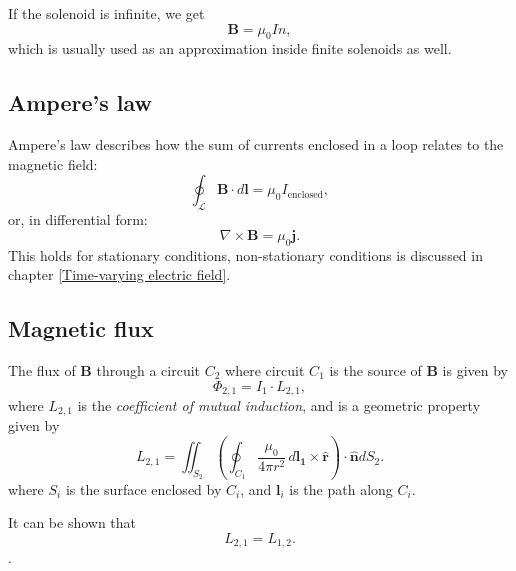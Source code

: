 \documentclass[a4paper, 12pt]{article}
\renewcommand{\vec}[1]{\bm{#1}}
\renewcommand{\j}{\ensuremath{\vec{j}}}
\newcommand{\B}{\ensuremath{\vec{B}}}
\let\tmp\hat
\renewcommand{\hat}[1]{\vec{\tmp{#1}}}
\begin{document}
            If the solenoid is infinite, we get
            \begin{equation}
                \B = \mu_0 In,
            \end{equation}
            which is usually used as an approximation inside finite solenoids as well.
    
    \subsection{Ampere's law}
        Ampere's law describes how the sum of currents enclosed in a loop relates to the magnetic field: 
        \begin{equation}
            \oint_\mathcal{L}\B\cdot d\vec{l} = \mu_0 I_{\text{enclosed}},
        \end{equation}
        or, in differential form: 
        \begin{equation}
            \nabla\times\B = \mu_0\j.
        \end{equation}
        This holds for stationary conditions, non-stationary conditions is discussed in chapter \ref{Time-varying electric field}. 

    \subsection{Magnetic flux} \label{Magnetic flux}
        The flux of \B{} through a circuit $C_2$ where circuit $C_1$ is the source of \B{} is given by
        \begin{equation}
            \Phi_{2,1} = I_1 \cdot L_{2,1},
        \end{equation}
        where $L_{2,1}$ is the \textit{coefficient of mutual induction}, and is a geometric property given by
        \begin{equation}
            L_{2,1} = \iint_{S_2} \left(\oint_{C_1}\frac{\mu_0}{4\pi r^2}\,d\vec{l_1}\times \hat{r} \right)\cdot \hat{n} dS_2.
        \end{equation}
        where $S_i$ is the surface enclosed by $C_i$, and $\vec{l}_i$ is the path along $C_i$.

        It can be shown that 
        \begin{equation}
            L_{2,1} = L_{1,2}.
        \end{equation}.
    
\end{document}
